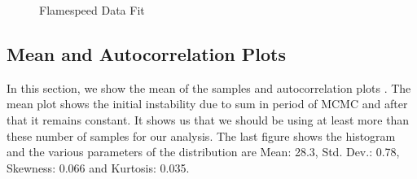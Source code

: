 \begin{figure}[H]
  \ContinuedFloat
  \caption{Flamespeed Data Fit}
\end{figure}




\subsection{Mean and Autocorrelation Plots}

 In this section, we show the mean of the samples and autocorrelation plots . The mean plot shows the initial instability due to sum in period of MCMC and after that it remains constant. It shows us that we should be using at least more than these number of samples for our analysis. The last figure shows the histogram and the various parameters of the distribution are Mean:  28.3, Std. Dev.:  0.78, Skewness:  0.066 and Kurtosis:  0.035.


